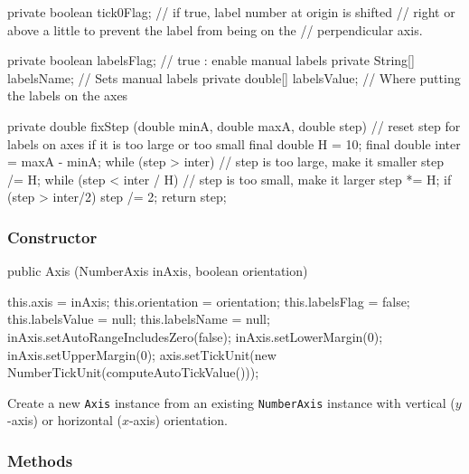 \begin{code}
\begin{hide}
   private boolean tick0Flag; // if true, label number at origin is shifted
   // right or above a little to prevent the label from being on the
   // perpendicular axis.

   private boolean  labelsFlag;    // true : enable manual labels
   private String[] labelsName;    // Sets manual labels
   private double[] labelsValue;   // Where putting the labels on the axes

   private double fixStep (double minA, double maxA, double step) {
      // reset step for labels on axes if it is too large or too small
      final double H = 10;
      final double inter = maxA - minA;
      while (step > inter)   // step is too large, make it smaller
         step /= H;
      while (step < inter / H)   // step is too small, make it larger
         step *= H;
      if (step > inter/2)
         step /= 2;
      return step;
   }

\end{hide}
\end{code}

\subsubsection*{Constructor}

\begin{code}
   public Axis (NumberAxis inAxis, boolean orientation) \begin{hide} {
      this.axis = inAxis;
      this.orientation = orientation;
      this.labelsFlag = false;
      this.labelsValue = null;
      this.labelsName = null;
      inAxis.setAutoRangeIncludesZero(false);
      inAxis.setLowerMargin(0);
      inAxis.setUpperMargin(0);
      axis.setTickUnit(new NumberTickUnit(computeAutoTickValue()));
   }\end{hide}
\end{code}
\begin{tabb}
   Create a new \texttt{Axis} instance from an existing \texttt{NumberAxis}
   instance with vertical ($y$-axis) or horizontal ($x$-axis) orientation.
\end{tabb}
\begin{htmlonly}
\end{htmlonly}

\subsubsection*{Methods}

